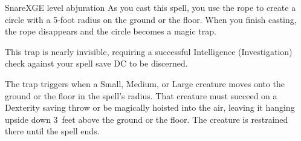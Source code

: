 \begin{spell}{Snare}{XGE}{ level abjuration}
{
}
As you cast this spell, you use the rope to create a circle
with a 5-foot radius on the ground or the floor. When
you finish casting, the rope disappears and the circle
becomes a magic trap.

This trap is nearly invisible, requiring a successful
Intelligence (Investigation) check against your spell save
DC to be discerned.

The trap triggers when a Small, Medium, or Large
creature moves onto the ground or the floor in the
spell's radius. That creature must succeed on a Dexterity
saving throw or be magically hoisted into the air,
leaving it hanging upside down 3~feet above the ground
or the floor. The creature is restrained there until the
spell ends.
\end{spell}